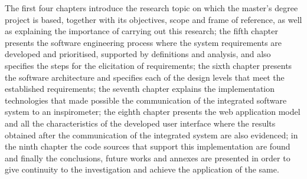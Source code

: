 \documentclass[12pt]{article}
\begin{document}
The first four chapters introduce the research topic on which the master's degree project is based, together with its objectives, scope and frame of reference, as well as explaining the importance of carrying out this research; the fifth chapter presents the software engineering process where the system requirements are developed and prioritised, supported by definitions and analysis, and also specifies the steps for the elicitation of requirements; the sixth chapter presents the software architecture and specifies each of the design levels that meet the established requirements; the seventh chapter explains the implementation technologies that made possible the communication of the integrated software system to an inspirometer; the eighth chapter presents the web application model and all the characteristics of the developed user interface where the results obtained after the communication of the integrated system are also evidenced; in the ninth chapter the code sources that support this implementation are found and finally the conclusions, future works and annexes are presented in order to give continuity to the investigation and achieve the application of the same. 





\newpage

\end{document}
